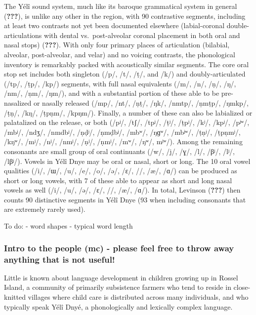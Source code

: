 \documentclass[english,,man,floatsintext]{apa6}
\begin{document}
The Yélî sound system, much like its baroque grammatical system in
general ({\textbf{???}}), is unlike any other in the region, with 90
contrastive segments, including at least two contrasts not yet been
documented elsewhere (labial-coronal double-articulations with dental
vs.~post-alveolar coronal placement in both oral and nasal stops)
({\textbf{???}}). With only four primary places of articulation
(bilabial, alveolar, post-alveolar, and velar) and no voicing contrasts,
the phonological inventory is remarkably packed with acoustically
similar segments. The core oral stop set includes both singleton (/p/,
/t/, /ṭ/, and /k/) and doubly-articulated (/tp/, /ṭp/, /kp/) segments,
with full nasal equivalents (/m/, /n/, /ṇ/, /ŋ/, /nm/, /ṇm/, /ŋm/), and
with a substantial portion of these able to be pre-nasalized or nasally
released (/mp/, /nt/, /ṇṭ/, /ŋk/, /nmtp/, /ṇmṭp/, /ŋmkp/, /ṭṇ/, /kŋ/,
/ṭpṇm/, /kpŋm/). Finally, a number of these can also be labialized or
palatalized on the release, or both (/pʲ/, /tʃ/, /tpʲ/, /ṭʲ/, /ṭpʲ/,
/kʲ/, /kpʲ/, /pʲʷ/, /mbʲ/, /ndʒ/, /nmdbʲ/, /ṇḍʲ/, /ṇmḍbʲ/, /mbʷ/, /ŋɡʷ/,
/mbʲʷ/, /ṭṇʲ/, /ṭpṇmʲ/, /kŋʷ/, /mʲ/, /nʲ/, /nmʲ/, /ṇʲ/, /ṇmʲ/, /mʷ/,
/ŋʷ/, mʲʷ/). Among the remaining consonants are small group of oral
continuants (/w/, /j/, /ɣ/, /l/, /βʲ/, /lʲ/, /lβʲ/). Vowels in Yélî Dnye
may be oral or nasal, short or long. The 10 oral vowel qualities (/i/,
/ɯ/, /u/, /e/, /o/, /ə/, /ɛ/, //, /æ/, /ɑ/) can be produced
as short or long vowels, with 7 of these able to appear as short and
long nasal vowels as well (/i/, /u/, /ə/, /ɛ/, //, /æ/, /ɑ/).
In total, Levinson ({\textbf{???}}) then counts 90 distinctive segments
in Yélî Dnye (93 when including consonants that are extremely rarely
used).

To do: - word shapes - typical word length

\subsubsection{\texorpdfstring{Intro to the people (\textbf{mc}) -
please feel free to throw away anything that is not
useful!}{Intro to the people (mc) - please feel free to throw away anything that is not useful!}}\label{intro-to-the-people-mc---please-feel-free-to-throw-away-anything-that-is-not-useful}

Little is known about language development in children growing up in
Rossel Island, a community of primarily subsistence farmers who tend to
reside in close-knitted villages where child care is distributed across
many individuals, and who typically speak Yélî Dnyé, a phonologically
and lexically complex language.
\end{document}

